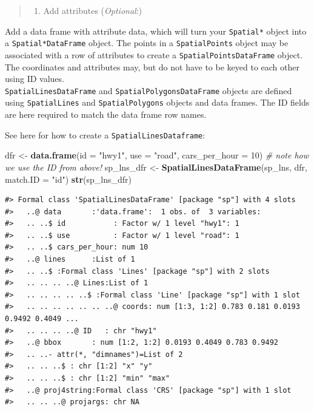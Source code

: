 \documentclass[]{book}
\newenvironment{Shaded}{\begin{snugshade}}{\end{snugshade}}
\newcommand{\KeywordTok}[1]{\textcolor[rgb]{0.13,0.29,0.53}{\textbf{#1}}}
\newcommand{\DataTypeTok}[1]{\textcolor[rgb]{0.13,0.29,0.53}{#1}}
\newcommand{\DecValTok}[1]{\textcolor[rgb]{0.00,0.00,0.81}{#1}}
\newcommand{\StringTok}[1]{\textcolor[rgb]{0.31,0.60,0.02}{#1}}
\newcommand{\CommentTok}[1]{\textcolor[rgb]{0.56,0.35,0.01}{\textit{#1}}}
\newcommand{\NormalTok}[1]{#1}
\providecommand{\tightlist}{%
  \setlength{\itemsep}{0pt}\setlength{\parskip}{0pt}}
\theoremstyle{definition}
\theoremstyle{definition}
\theoremstyle{definition}
\theoremstyle{remark}
\begin{document}
\begin{quote}
\begin{enumerate}
\def\labelenumi{\Roman{enumi}.}
\setcounter{enumi}{2}
\tightlist
\item
  Add attributes (\emph{Optional}:)
\end{enumerate}
\end{quote}

Add a data frame with attribute data, which will turn your
\texttt{Spatial*} object into a \texttt{Spatial*DataFrame} object. The
points in a \texttt{SpatialPoints} object may be associated with a row
of attributes to create a \texttt{SpatialPointsDataFrame} object. The
coordinates and attributes may, but do not have to be keyed to each
other using ID values.\\
\texttt{SpatialLinesDataFrame} and \texttt{SpatialPolygonsDataFrame}
objects are defined using \texttt{SpatialLines} and
\texttt{SpatialPolygons} objects and data frames. The ID fields are here
required to match the data frame row names.

See here for how to create a \texttt{SpatialLinesDataframe}:

\begin{Shaded}
\begin{Highlighting}[]
\NormalTok{dfr <-}\StringTok{ }\KeywordTok{data.frame}\NormalTok{(}\DataTypeTok{id =} \StringTok{"hwy1"}\NormalTok{, }\DataTypeTok{use =} \StringTok{"road"}\NormalTok{, }\DataTypeTok{cars_per_hour =} \DecValTok{10}\NormalTok{) }\CommentTok{# note how we use the ID from above!}
\NormalTok{sp_lns_dfr <-}\StringTok{ }\KeywordTok{SpatialLinesDataFrame}\NormalTok{(sp_lns, dfr, }\DataTypeTok{match.ID =} \StringTok{"id"}\NormalTok{)}
\KeywordTok{str}\NormalTok{(sp_lns_dfr)}
\end{Highlighting}
\end{Shaded}

\begin{verbatim}
#> Formal class 'SpatialLinesDataFrame' [package "sp"] with 4 slots
#>   ..@ data       :'data.frame':  1 obs. of  3 variables:
#>   .. ..$ id           : Factor w/ 1 level "hwy1": 1
#>   .. ..$ use          : Factor w/ 1 level "road": 1
#>   .. ..$ cars_per_hour: num 10
#>   ..@ lines      :List of 1
#>   .. ..$ :Formal class 'Lines' [package "sp"] with 2 slots
#>   .. .. .. ..@ Lines:List of 1
#>   .. .. .. .. ..$ :Formal class 'Line' [package "sp"] with 1 slot
#>   .. .. .. .. .. .. ..@ coords: num [1:3, 1:2] 0.783 0.181 0.0193 0.9492 0.4049 ...
#>   .. .. .. ..@ ID   : chr "hwy1"
#>   ..@ bbox       : num [1:2, 1:2] 0.0193 0.4049 0.783 0.9492
#>   .. ..- attr(*, "dimnames")=List of 2
#>   .. .. ..$ : chr [1:2] "x" "y"
#>   .. .. ..$ : chr [1:2] "min" "max"
#>   ..@ proj4string:Formal class 'CRS' [package "sp"] with 1 slot
#>   .. .. ..@ projargs: chr NA
\end{verbatim}
\end{document}
